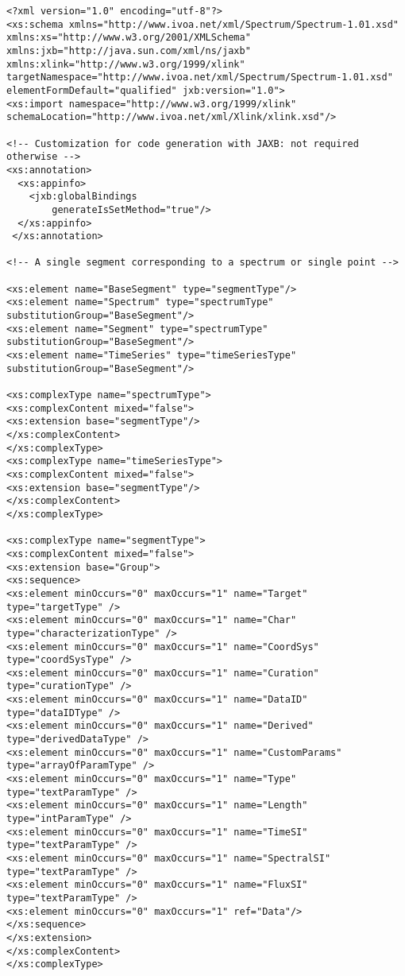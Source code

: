 { \footnotesize
\begin{flushleft}

\begin{fmppage}


\begin{verbatim}
<?xml version="1.0" encoding="utf-8"?>
<xs:schema xmlns="http://www.ivoa.net/xml/Spectrum/Spectrum-1.01.xsd"
xmlns:xs="http://www.w3.org/2001/XMLSchema"
xmlns:jxb="http://java.sun.com/xml/ns/jaxb"
xmlns:xlink="http://www.w3.org/1999/xlink"
targetNamespace="http://www.ivoa.net/xml/Spectrum/Spectrum-1.01.xsd"
elementFormDefault="qualified" jxb:version="1.0">
<xs:import namespace="http://www.w3.org/1999/xlink" schemaLocation="http://www.ivoa.net/xml/Xlink/xlink.xsd"/>

<!-- Customization for code generation with JAXB: not required otherwise -->
<xs:annotation>
  <xs:appinfo>
    <jxb:globalBindings
        generateIsSetMethod="true"/>
  </xs:appinfo>
 </xs:annotation>

<!-- A single segment corresponding to a spectrum or single point -->

<xs:element name="BaseSegment" type="segmentType"/>
<xs:element name="Spectrum" type="spectrumType" substitutionGroup="BaseSegment"/>
<xs:element name="Segment" type="spectrumType" substitutionGroup="BaseSegment"/>
<xs:element name="TimeSeries" type="timeSeriesType" substitutionGroup="BaseSegment"/>

<xs:complexType name="spectrumType">
<xs:complexContent mixed="false">
<xs:extension base="segmentType"/>
</xs:complexContent>
</xs:complexType>
<xs:complexType name="timeSeriesType">
<xs:complexContent mixed="false">
<xs:extension base="segmentType"/>
</xs:complexContent>
</xs:complexType>

<xs:complexType name="segmentType">
<xs:complexContent mixed="false">
<xs:extension base="Group">
<xs:sequence>
<xs:element minOccurs="0" maxOccurs="1" name="Target" type="targetType" />
<xs:element minOccurs="0" maxOccurs="1" name="Char" type="characterizationType" />
<xs:element minOccurs="0" maxOccurs="1" name="CoordSys" type="coordSysType" />
<xs:element minOccurs="0" maxOccurs="1" name="Curation" type="curationType" />
<xs:element minOccurs="0" maxOccurs="1" name="DataID" type="dataIDType" />
<xs:element minOccurs="0" maxOccurs="1" name="Derived" type="derivedDataType" />
<xs:element minOccurs="0" maxOccurs="1" name="CustomParams" type="arrayOfParamType" />
<xs:element minOccurs="0" maxOccurs="1" name="Type" type="textParamType" />
<xs:element minOccurs="0" maxOccurs="1" name="Length" type="intParamType" />
<xs:element minOccurs="0" maxOccurs="1" name="TimeSI" type="textParamType" />
<xs:element minOccurs="0" maxOccurs="1" name="SpectralSI" type="textParamType" />
<xs:element minOccurs="0" maxOccurs="1" name="FluxSI" type="textParamType" />
<xs:element minOccurs="0" maxOccurs="1" ref="Data"/>
</xs:sequence>
</xs:extension>
</xs:complexContent>
</xs:complexType>


\end{verbatim}
\end{fmppage}
\end{flushleft}}
